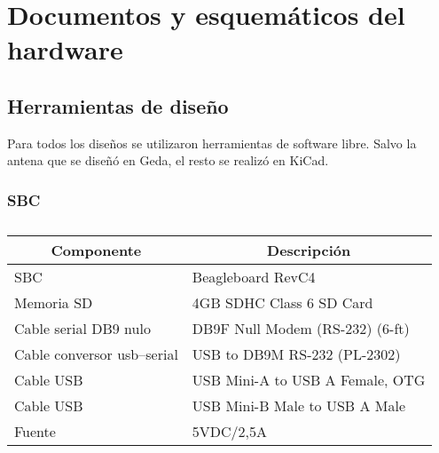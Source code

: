 \chapter{Documentos y esquem\'aticos del hardware}

\section{Herramientas de diseño}

Para todos los diseños se utilizaron herramientas de software libre. Salvo la antena que se diseñó en Geda, el resto se realizó en KiCad.

\subsection{SBC}
\begin{table}[htbp]
\begin{center}
\begin{tabular}{|l|l|}
\hline
\multicolumn{1}{|c|}{\textbf{Componente}} & \multicolumn{1}{c|}{\textbf{Descripción}} \\ \hline
SBC & Beagleboard  RevC4 \\ \hline
Memoria SD & 4GB SDHC Class 6 SD Card \\ \hline
Cable serial DB9 nulo & DB9F Null Modem (RS-232) (6-ft) \\ \hline
Cable conversor usb–serial & USB to DB9M RS-232 (PL-2302) \\ \hline
Cable USB & USB Mini-A to USB A Female, OTG \\ \hline
Cable USB & USB Mini-B Male to USB A Male \\ \hline
Fuente  & 5VDC/2,5A \\ \hline
\end{tabular}
\end{center}
\caption{}
\label{}
\end{table}


